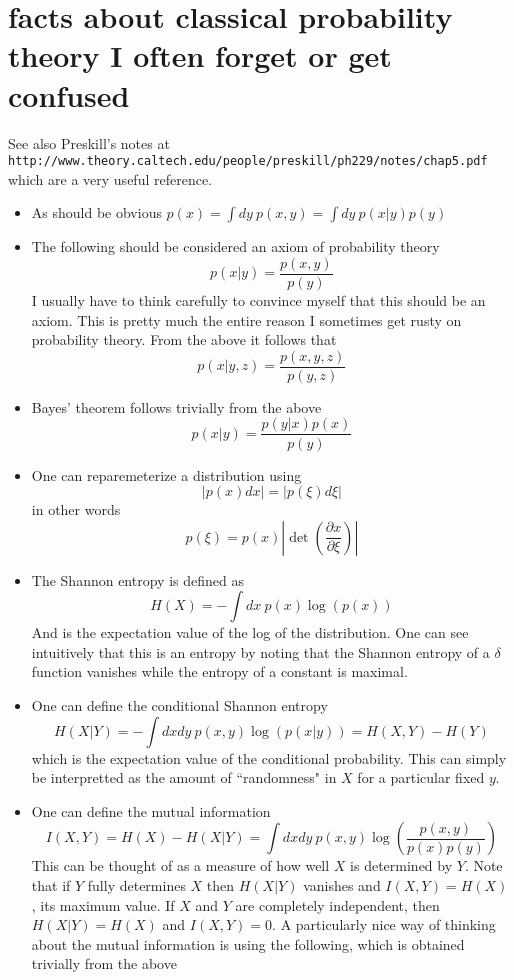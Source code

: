 \documentclass[10pt]{article}
\begin{document}
\section{facts about classical probability theory I often forget or get confused}
See also Preskill's notes at \texttt{http://www.theory.caltech.edu/people/preskill/ph229/notes/chap5.pdf} which are a very useful reference.
\begin{itemize}
	\item As should be obvious $p(x) = \int dy~p(x,y) = \int dy~p(x|y)p(y)$
    \item The following should be considered an axiom of probability theory
        $$ p(x|y) = \frac{p(x,y)}{p(y)} $$
        I usually have to think carefully to convince myself that this should be an axiom.  This is pretty much the entire reason I sometimes get rusty on
        probability theory.  From the above it follows that
        $$ p(x|y,z) = \frac{p(x,y,z)}{p(y,z)} $$
    \item Bayes' theorem follows trivially from the above
        $$ p(x|y) = \frac{p(y|x)p(x)}{p(y)} $$
	\item One can reparemeterize a distribution using
		$$ |p(x)dx| = |p(\xi)d\xi| $$
		in other words
		$$ p(\xi) = p(x)\left|\det\left(\frac{\partial x}{\partial \xi}\right)\right| $$
    \item The Shannon entropy is defined as
        $$ H(X) = -\int dx~ p(x)\log(p(x)) $$
        And is the expectation value of the log of the distribution.  One can see intuitively that this is an entropy by noting that the Shannon entropy of a
        $\delta$ function vanishes while the entropy of a constant is maximal.
    \item One can define the conditional Shannon entropy
        $$ H(X|Y) = -\int dxdy ~ p(x,y)\log(p(x|y)) = H(X,Y) - H(Y)$$
        which is the expectation value of the conditional probability.  This can simply be interpretted as the amount of ``randomness" in $X$ for a particular fixed $y$.
	\item One can define the mutual information
		$$ I(X,Y) = H(X) - H(X|Y) = \int dxdy ~ p(x,y)\log\left(\frac{p(x,y)}{p(x)p(y)}\right) $$
		This can be thought of as a measure of how well $X$ is determined by $Y$.  Note that if $Y$ fully determines $X$ then $H(X|Y)$ vanishes and $I(X,Y)=H(X)$, its maximum value.	
		If $X$ and $Y$ are completely independent, then $H(X|Y) = H(X)$ and $I(X,Y)=0$.
		A particularly nice way of thinking about the mutual information is using the following, which is obtained trivially from the above

\end{itemize}
\end{document}
